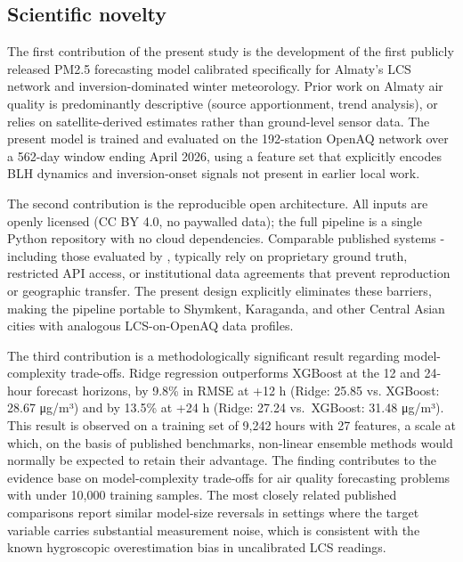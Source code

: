 \subsection{Scientific novelty}\label{scientific-novelty}

The first contribution of the present study is the development of the first publicly released PM2.5 forecasting model calibrated specifically for Almaty's LCS network and inversion-dominated winter meteorology. Prior work on Almaty air quality is predominantly descriptive (source apportionment, trend analysis), or relies on satellite-derived estimates rather than ground-level sensor data. The present model is trained and evaluated on the 192-station OpenAQ network over a 562-day window ending April 2026, using a feature set that explicitly encodes BLH dynamics and inversion-onset signals not present in earlier local work.

The second contribution is the reproducible open architecture. All inputs are openly licensed (CC BY 4.0, no paywalled data); the full pipeline is a single Python repository with no cloud dependencies. Comparable published systems - including those evaluated by \cite{enebish2021ulaanbaatar, menares2021forecasting, Ayus2023Comparison}, typically rely on proprietary ground truth, restricted API access, or institutional data agreements that prevent reproduction or geographic transfer. The present design explicitly eliminates these barriers, making the pipeline portable to Shymkent, Karaganda, and other Central Asian cities with analogous LCS-on-OpenAQ data profiles.

The third contribution is a methodologically significant result regarding model-complexity trade-offs. Ridge regression outperforms XGBoost at the 12 and 24-hour forecast horizons, by 9.8\% in RMSE at +12 h (Ridge: 25.85 vs. XGBoost: 28.67 μg/m³) and by 13.5\% at +24 h (Ridge: 27.24 vs.~XGBoost: 31.48 μg/m³). This result is observed on a training set of 9,242 hours with 27 features, a scale at which, on the basis of published benchmarks, non-linear ensemble methods would normally be expected to retain their advantage. The finding contributes to the evidence base on model-complexity trade-offs for air quality forecasting problems with under 10,000 training samples. The most closely related published comparisons \cite{enebish2021ulaanbaatar, menares2021forecasting} report similar model-size reversals in settings where the target variable carries substantial measurement noise, which is consistent with the known hygroscopic overestimation bias in uncalibrated LCS readings.

